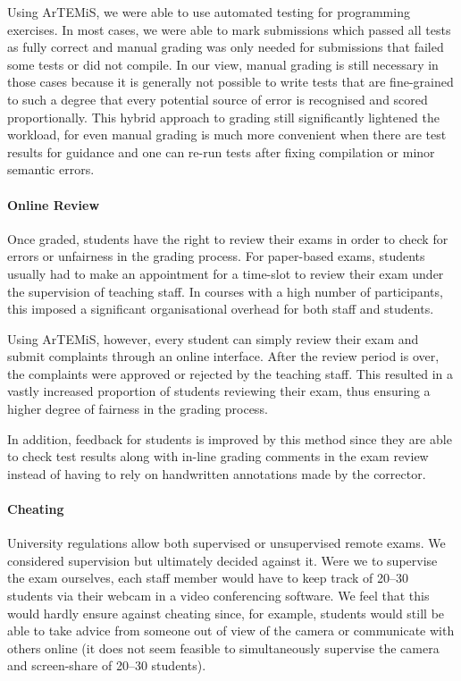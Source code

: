 Using ArTEMiS, we were able to use automated testing for programming exercises.
In most cases, we were able to mark submissions which passed all tests as fully correct
and manual grading was only needed for submissions that failed some tests or did not compile.
In our view, manual grading is still necessary in those cases because it is generally not possible to write tests that are fine-grained to such a degree that every potential source of error is recognised and scored proportionally.
This hybrid approach to grading still significantly lightened the workload, for even manual grading is much more convenient when there are test results for guidance and one can re-run tests after fixing compilation or minor semantic errors.

\paragraph{Online Review}

Once graded, students have the right to review their
exams in order to check for errors or unfairness in the grading process.
For paper-based exams, students usually had to make an
appointment for a time-slot to review their exam under
the supervision of teaching staff.
In courses with a high number of participants, this imposed a significant organisational overhead for both staff and students.

Using ArTEMiS, however, every student can simply review their exam and submit complaints through an online interface.
After the review period is over,
the complaints were approved or rejected by the teaching staff.
This resulted in a vastly increased proportion of students reviewing their exam,
thus ensuring a higher degree of fairness in the grading process.

In addition, feedback for students is improved by this method since they are able to check test results along with in-line grading comments in the exam review instead of having to rely on handwritten annotations made by the corrector.

\paragraph{Cheating}

University regulations allow both supervised or unsupervised remote exams.
We considered supervision but ultimately decided against it. Were we to supervise the exam ourselves,
each staff member would have to keep track of 20--30 students via their webcam in a video conferencing software.
We feel that this would hardly ensure against cheating
since, for example, students would still be able to take advice from someone out of view of the camera or communicate with others online (it does not seem feasible to simultaneously supervise the camera and screen-share of 20--30 students).

